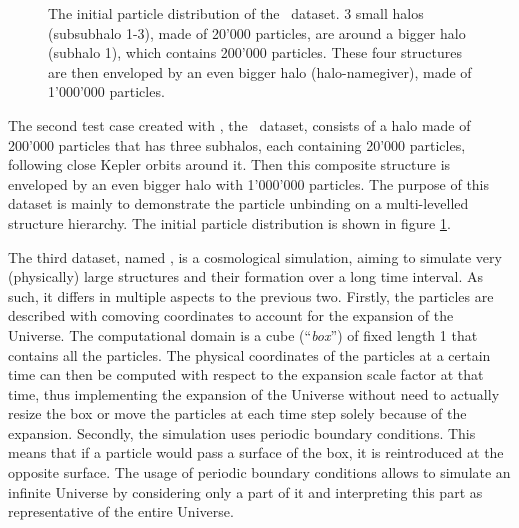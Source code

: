 \begin{figure}[htbp!]
		\caption{
			The initial particle distribution of the \ds\ dataset. 3 small halos (subsubhalo 1-3), made of 20'000 particles, are around a bigger halo (subhalo 1), which contains 200'000 particles. These four structures are then enveloped by an even bigger halo (halo-namegiver), made of 1'000'000 particles.
		}%
		\label{fig:dice_sub_origin}
	\endminipage\hspace*{\fill} 
\end{figure}



The second test case created with \dice, the \ds\ dataset, consists of a halo made of 200'000 particles that has three subhalos, each containing 20'000 particles, following close Kepler orbits around it.
Then this composite structure is enveloped by an even bigger halo with 1'000'000 particles.
The purpose of this dataset is mainly to demonstrate the particle unbinding on a multi-levelled structure hierarchy.
The initial particle distribution is shown in figure \ref{fig:dice_sub_origin}.



The third dataset, named \cosmo, is a cosmological simulation, aiming to simulate very (physically) large structures and their formation over a long time interval. 
As such, it differs in multiple aspects to the previous two.
Firstly, the particles are described with comoving coordinates to account for the expansion of the Universe.
The computational domain is a cube (``\emph{box}'') of fixed length 1 that contains all the particles.
The physical coordinates of the particles at a certain time can then be computed with respect to the expansion scale factor at that time, thus implementing the expansion of the Universe without need to actually resize the box or move the particles at each time step solely because of the expansion.
Secondly, the simulation uses periodic boundary conditions. 
This means that if a particle would pass a surface of the box, it is reintroduced at the opposite surface.
The usage of periodic boundary conditions allows to simulate an infinite Universe by considering only a part of it and interpreting this part as representative of the entire Universe.



